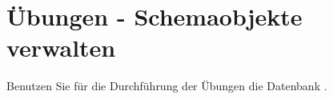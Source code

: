 \clearpage
    \section{\"Ubungen - Schemaobjekte verwalten}
      Benutzen Sie für die Durchführung der Übungen die Datenbank
      .
      \begin{enumerate}
        
        
        
        
        
        
        
        
        
        
        
        
        


\end{enumerate}
